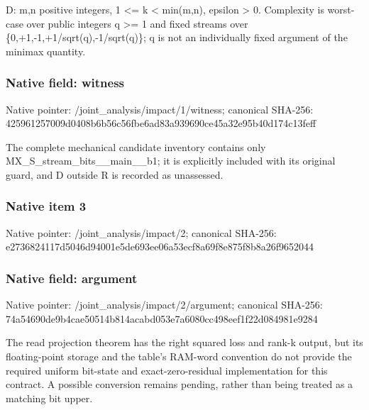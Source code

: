 \documentclass[10pt,a4paper]{article}
\begin{document}
\begingroup\raggedright\sloppy D:\allowbreak{} m,\allowbreak{}n positive integers,\allowbreak{} 1 <=\allowbreak{} k < min(m,\allowbreak{}n),\allowbreak{} epsilon > 0. Complexity is worst-case over public integers q >=\allowbreak{} 1 and fixed streams over \{0,\allowbreak{}+1,\allowbreak{}-1,\allowbreak{}+1/\allowbreak{}sqrt(q),\allowbreak{}-1/\allowbreak{}sqrt(q)\};\allowbreak{} q is not an individually fixed argument of the minimax quantity.\par\endgroup

\subsubsection{Native field: witness}
Native pointer: /joint\_\allowbreak{}analysis/impact/1/witness; canonical SHA-256: 425961257009d0408b6b56c56fbe6ad83a939690ce45a32e95b40d174c13feff

\begingroup\raggedright\sloppy The complete mechanical candidate inventory contains only MX\_\allowbreak{}S\_\allowbreak{}stream\_\allowbreak{}bits\_\allowbreak{}\_\allowbreak{}main\_\allowbreak{}\_\allowbreak{}b1;\allowbreak{} it is explicitly included with its original guard,\allowbreak{} and D outside R is recorded as unassessed.\par\endgroup

\subsubsection{Native item 3}
Native pointer: /joint\_\allowbreak{}analysis/impact/2; canonical SHA-256: e2736824117d5046d94001e5de693ee06a53ecf8a69f8e875f8b8a26f9652044

\subsubsection{Native field: argument}
Native pointer: /joint\_\allowbreak{}analysis/impact/2/argument; canonical SHA-256: 74a54690de9b4cae50514b814acabd053e7a6080cc498eef1f22d084981e9284

\begingroup\raggedright\sloppy The read projection theorem has the right squared loss and rank-k output,\allowbreak{} but its floating-point storage and the table's RAM-word convention do not provide the required uniform bit-state and exact-zero-residual implementation for this contract. A possible conversion remains pending,\allowbreak{} rather than being treated as a matching bit upper.\par\endgroup
\end{document}
